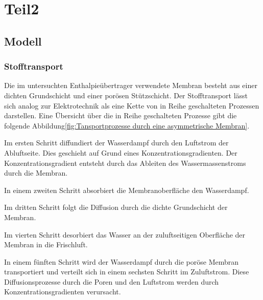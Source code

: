 \chapter{Teil2}
\label{cha:Physikalische Grundlagen}



\begin{normalsize}
\begin{LARGE}

\section{Modell}
\label{sec:Modell}


\subsection{Stofftransport}

Die im untersuchten Enthalpieübertrager verwendete Membran besteht aus einer dichten Grundschicht und einer porösen Stützschicht. Der Stofftransport lässt sich analog zur Elektrotechnik als eine Kette von in Reihe geschalteten Prozessen darstellen. Eine Übersicht über die in Reihe geschalteten Prozesse gibt die folgende Abbildung\ref{fig:Tansportprozesse durch eine asymmetrische Membran}.


Im ersten Schritt diffundiert der Wasserdampf durch den Luftstrom der Abluftseite. Dies geschieht auf Grund eines Konzentrationsgradienten. Der Konzentrationsgradient entsteht durch das Ableiten des Wassermassenstroms durch die Membran. 

In einem zweiten Schritt absorbiert die Membranoberfläche den Wasserdampf. 

Im dritten Schritt folgt die Diffusion durch die dichte Grundschicht der Membran. 

Im vierten Schritt desorbiert das Wasser an der zuluftseitigen Oberfläche der Membran in die Frischluft. 

In einem fünften Schritt wird der Wasserdampf durch die poröse Membran transportiert und verteilt sich in einem sechsten Schritt im Zuluftstrom. Diese Diffusionsprozesse durch die Poren und den Luftstrom werden durch Konzentrationsgradienten verursacht.



\end{LARGE}
\end{normalsize}
